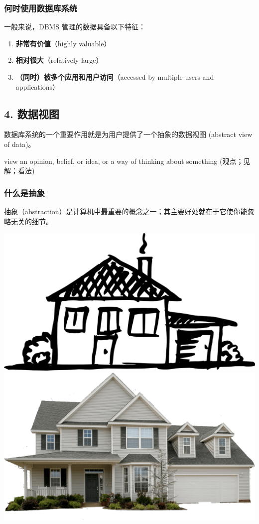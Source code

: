 \documentclass[aspectratio=169, 14pt]{beamer}
\begin{document}
\begin{frame}
	\frametitle{何时使用数据库系统}

	一般来说，DBMS 管理的数据具备以下特征：

	\begin{enumerate}
		\item \textbf{非常有价值}（highly valuable）
		\item \textbf{相对很大}（relatively large）
		\item \textbf{（同时）被多个应用和用户访问}（accessed by multiple users and applications）
	\end{enumerate}


\end{frame}

\begin{frame}
	\section{\textcolor{darkmidnightblue}{4. 数据视图}}
	数据库系统的一个重要作用就是为用户提供了一个\alert{抽象的数据视图} (abstract view of data)。

	\pause
	\begin{block}{view}
		an opinion, belief, or idea, or a way of thinking about something (观点；见解；看法)
	\end{block}
\end{frame}
\begin{frame}
	\frametitle{什么是抽象}
	抽象（abstraction）是计算机中最重要的概念之一；其主要好处就在于它使你能忽略无关的细节。

	\includegraphics[width=.45\textwidth]{image/house.png}
	\includegraphics[width=.45\textwidth]{image/home.png}
\end{frame}
\end{document}
